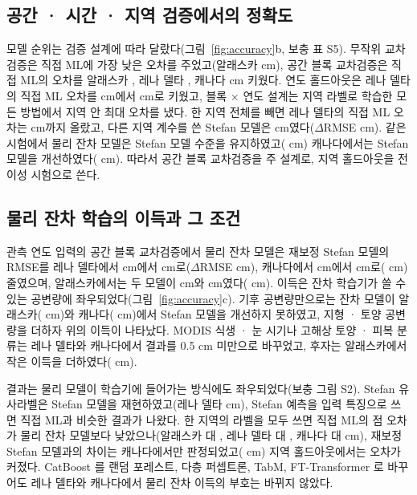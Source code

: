 \subsection{공간 · 시간 · 지역 검증에서의 정확도}
모델 순위는 검증 설계에 따라 달랐다(그림~\ref{fig:accuracy}b, 보충 표 S5). 무작위 교차검증은 직접 ML에 가장 낮은 오차를 주었고(알래스카 \nrmseAkrandDz{} cm), 공간 블록 교차검증은 직접 ML의 오차를 알래스카 \noptimAkDz, 레나 델타 \noptimLeDz, 캐나다 \noptimCaDz{} cm 키웠다. 연도 홀드아웃은 레나 델타의 직접 ML 오차를 \nrmseLeblkDz{} cm에서 \nrmseLeyrDz{} cm로 키웠고, 블록 × 연도 설계는 지역 라벨로 학습한 모든 방법에서 지역 안 최대 오차를 냈다. 한 지역 전체를 빼면 레나 델타의 직접 ML 오차는 \nrmseLeregDz{} cm까지 올랐고, 다른 지역 계수를 쓴 Stefan 모델은 \nrmseLeregPz{} cm였다($\Delta$RMSE \ndrefLeregDz{} cm). 같은 시험에서 물리 잔차 모델은 Stefan 모델 수준을 유지하였고(\ndrefLeregRo{} cm) 캐나다에서는 Stefan 모델을 개선하였다(\ndrefCaregRo{} cm). 따라서 공간 블록 교차검증을 주 설계로, 지역 홀드아웃을 전이성 시험으로 쓴다.

\subsection{물리 잔차 학습의 이득과 그 조건}
관측 연도 입력의 공간 블록 교차검증에서 물리 잔차 모델은 재보정 Stefan 모델의 RMSE를 레나 델타에서 \nrmseLeblkPo{} cm에서 \nrmseLeblkRo{} cm로($\Delta$RMSE \ndrefLeblkRo{} cm), 캐나다에서 \nrmseCablkPo{} cm에서 \nrmseCablkRo{} cm로(\ndrefCablkRo{} cm) 줄였으며, 알래스카에서는 두 모델이 \nrmseAkblkPo{} cm와 \nrmseAkblkRo{} cm였다(\ndrefAkblkRo{} cm). 이득은 잔차 학습기가 쓸 수 있는 공변량에 좌우되었다(그림~\ref{fig:accuracy}c). 기후 공변량만으로는 잔차 모델이 알래스카(\ndfeatAkFclim{} cm)와 캐나다(\ndfeatCaFclim{} cm)에서 Stefan 모델을 개선하지 못하였고, 지형 · 토양 공변량을 더하자 위의 이득이 나타났다. MODIS 식생 · 눈 시기나 고해상 토양 · 피복 분류는 레나 델타와 캐나다에서 결과를 0.5 cm 미만으로 바꾸었고, 후자는 알래스카에서 작은 이득을 더하였다(\ndfeatAkFhires{} cm).

결과는 물리 모델이 학습기에 들어가는 방식에도 좌우되었다(보충 그림 S2). Stefan 유사라벨은 Stefan 모델을 재현하였고(레나 델타 \ndrefLeblkDo{} cm), Stefan 예측을 입력 특징으로 쓰면 직접 ML과 비슷한 결과가 나왔다. 한 지역의 라벨을 모두 쓰면 직접 ML의 점 오차가 물리 잔차 모델보다 낮았으나(알래스카 \nrmseAkblkDz{} 대 \nrmseAkblkRo, 레나 델타 \nrmseLeblkDz{} 대 \nrmseLeblkRo, 캐나다 \nrmseCablkDz{} 대 \nrmseCablkRo{} cm), 재보정 Stefan 모델과의 차이는 캐나다에서만 판정되었고(\ndrefCablkDz{} cm) 지역 홀드아웃에서는 오차가 커졌다. CatBoost 를 랜덤 포레스트, 다층 퍼셉트론, TabM, FT-Transformer 로 바꾸어도 레나 델타와 캐나다에서 물리 잔차 이득의 부호는 바뀌지 않았다.

